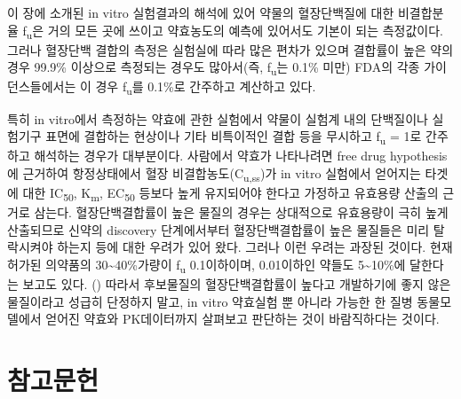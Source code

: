 \documentclass[
  11pt,
  krantz2, a4paper, twoside]{krantz}
\begin{document}
이 장에 소개된 in vitro 실험결과의 해석에 있어 약물의 혈장단백질에 대한
비결합분율 f\textsubscript{u}은 거의 모든 곳에 쓰이고 약효농도의 예측에 있어서도
기본이 되는 측정값이다. 그러나 혈장단백 결합의 측정은 실험실에 따라 많은
편차가 있으며 결합률이 높은 약의 경우 99.9\% 이상으로 측정되는 경우도 많아서(즉, f\textsubscript{u}는 0.1\% 미만) FDA의 각종 가이던스들에서는 이 경우
f\textsubscript{u}를 0.1\%로 간주하고 계산하고 있다.

특히 in vitro에서 측정하는 약효에 관한 실험에서 약물이 실험계 내의
단백질이나 실험기구 표면에 결합하는 현상이나 기타 비특이적인 결합 등을
무시하고 f\textsubscript{u} = 1로 간주하고 해석하는 경우가 대부분이다. 사람에서 약효가
나타나려면 free drug hypothesis에 근거하여 항정상태에서 혈장
비결합농도(C\textsubscript{u,ss})가 in vitro 실험에서 얻어지는 타겟에 대한 IC\textsubscript{50},
K\textsubscript{m}, EC\textsubscript{50} 등보다 높게 유지되어야 한다고 가정하고 유효용량 산출의
근거로 삼는다. 혈장단백결합률이 높은 물질의 경우는 상대적으로 유효용량이
극히 높게 산출되므로 신약의 discovery 단계에서부터 혈장단백결합률이 높은
물질들은 미리 탈락시켜야 하는지 등에 대한 우려가 있어 왔다. 그러나 이런
우려는 과장된 것이다. 현재 허가된 의약품의 30\textasciitilde40\%가량이 f\textsubscript{u} 0.1이하이며,
0.01이하인 약들도 5\textasciitilde10\%에 달한다는 보고도 있다. ()
따라서 후보물질의 혈장단백결합률이 높다고 개발하기에 좋지 않은
물질이라고 성급히 단정하지 말고, in vitro 약효실험 뿐 아니라 가능한 한
질병 동물모델에서 얻어진 약효와 PK데이터까지 살펴보고 판단하는 것이
바람직하다는 것이다.

\backmatter

\chapter*{참고문헌}\label{uxcc38uxace0uxbb38uxd5cc}
\end{document}
